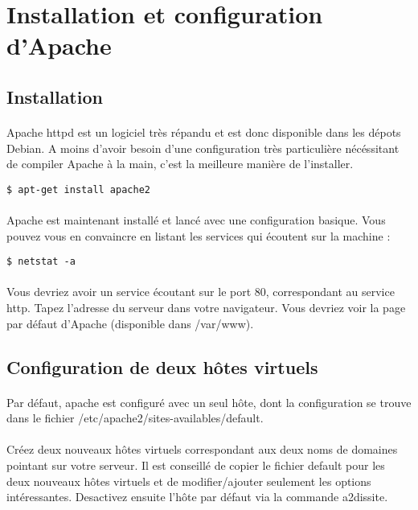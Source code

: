 \documentclass[12pt,a4paper]{article}
\begin{document}
\section{Installation et configuration d'Apache}
\subsection{Installation}

\paragraph{}
Apache httpd est un logiciel très répandu et est donc disponible dans les dépots Debian. A moins d'avoir besoin d'une configuration très particulière nécéssitant de compiler Apache à la main, c'est la meilleure manière de l'installer.

\begin{lstlisting}
$ apt-get install apache2
\end{lstlisting}

\paragraph{}
Apache est maintenant installé et lancé avec une configuration basique. Vous pouvez vous en convaincre en listant les services qui écoutent sur la machine : 

\begin{lstlisting}
$ netstat -a
\end{lstlisting}

\paragraph{}
Vous devriez avoir un service écoutant sur le port 80, correspondant au service http. Tapez l'adresse du serveur dans votre navigateur. Vous devriez voir la page par défaut d'Apache (disponible dans /var/www).

\subsection{Configuration de deux hôtes virtuels}
\paragraph{}
Par défaut, apache est configuré avec un seul hôte, dont la configuration se trouve dans le fichier /etc/apache2/sites-availables/default.

\paragraph{}
Créez deux nouveaux hôtes virtuels correspondant aux deux noms de domaines pointant sur votre serveur. Il est conseillé de copier le fichier default pour les deux nouveaux hôtes virtuels et de modifier/ajouter seulement les options intéressantes. Desactivez ensuite l'hôte par défaut via la commande a2dissite.
\end{document}
